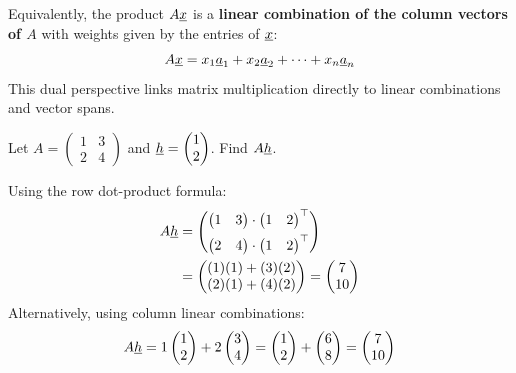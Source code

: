 \begin{remark}
    Equivalently, the product $A\underline{x}$ is a \textbf{linear combination of the column vectors of $A$} with weights given by the entries of $\underline{x}$:
    \[
        A\underline{x} = x_1 \underline{a}_1 + x_2 \underline{a}_2 + \dots + x_n \underline{a}_n
    \]
    This dual perspective links matrix multiplication directly to linear combinations and vector spans.
\end{remark}

\begin{exercise}
    Let $A = \begin{pmatrix} 1 & 3 \\ 2 & 4 \end{pmatrix}$ and $\underline{h} = \begin{pmatrix} 1 \\ 2 \end{pmatrix}$. Find $A\underline{h}$.
\end{exercise}

\begin{solution}
    Using the row dot-product formula:
    \begin{align*}
        A\underline{h} &= \begin{pmatrix} \begin{pmatrix} 1 & 3 \end{pmatrix} \cdot \begin{pmatrix} 1 & 2 \end{pmatrix}^{\top} \\[4pt] \begin{pmatrix} 2 & 4 \end{pmatrix} \cdot \begin{pmatrix} 1 & 2 \end{pmatrix}^{\top} \end{pmatrix} \\
        &= \begin{pmatrix} (1)(1) + (3)(2) \\ (2)(1) + (4)(2) \end{pmatrix} = \begin{pmatrix} 7 \\ 10 \end{pmatrix}
    \end{align*}
    Alternatively, using column linear combinations:
    \[
        A\underline{h} = 1\begin{pmatrix} 1 \\ 2 \end{pmatrix} + 2\begin{pmatrix} 3 \\ 4 \end{pmatrix} = \begin{pmatrix} 1 \\ 2 \end{pmatrix} + \begin{pmatrix} 6 \\ 8 \end{pmatrix} = \begin{pmatrix} 7 \\ 10 \end{pmatrix}
    \]
\end{solution}

